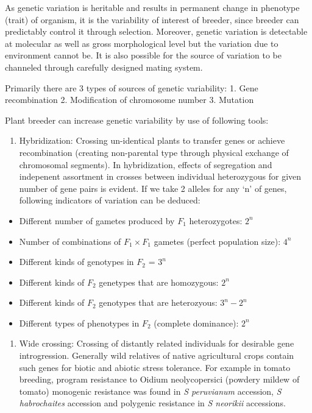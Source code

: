 \documentclass[
  openany]{book}
\providecommand{\tightlist}{%
  \setlength{\itemsep}{0pt}\setlength{\parskip}{0pt}}
\begin{document}
As genetic variation is heritable and results in permanent change in phenotype (trait) of organism, it is the variability of interest of breeder, since breeder can predictably control it through selection. Moreover, genetic variation is detectable at molecular as well as gross morphological level but the variation due to environment cannot be. It is also possible for the source of variation to be channeled through carefully designed mating system.

Primarily there are 3 types of sources of genetic variability:
1. Gene recombination
2. Modification of chromosome number
3. Mutation

Plant breeder can increase genetic variability by use of following tools:

\begin{enumerate}
\def\labelenumi{\arabic{enumi}.}
\tightlist
\item
  Hybridization: Crossing un-identical plants to transfer genes or achieve recombination (creating non-parental type through physical exchange of chromosomal segments). In hybridization, effects of segregation and indepenent assortment in crosses between individual heterozygous for given number of gene pairs is evident. If we take 2 alleles for any `n' of genes, following indicators of variation can be deduced:
\end{enumerate}

\begin{itemize}
\tightlist
\item
  Different number of gametes produced by \(F_1\) heterozygotes: \(2^n\)
\item
  Number of combinations of \(F_1 \times F_1\) gametes (perfect population size): \(4^n\)
\item
  Different kinds of genotypes in \(F_2\) = \(3^n\)
\item
  Different kinds of \(F_2\) genetypes that are homozygous: \(2^n\)
\item
  Different kinds of \(F_2\) genotypes that are heterozyous: \(3^n-2^n\)
\item
  Different types of phenotypes in \(F_2\) (complete dominance): \(2^n\)
\end{itemize}

\begin{enumerate}
\def\labelenumi{\arabic{enumi}.}
\setcounter{enumi}{1}
\tightlist
\item
  Wide crossing: Crossing of distantly related individuals for desirable gene introgression. Generally wild relatives of native agricultural crops contain such genes for biotic and abiotic stress tolerance. For example in tomato breeding, program resistance to Oidium neolycopersici (powdery mildew of tomato) monogenic resistance was found in \emph{S peruvianum} accession, \emph{S habrochaites} accession and polygenic resistance in \emph{S neorikii} accessions.
\end{enumerate}
\end{document}
